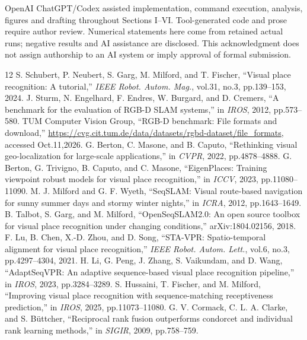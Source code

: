 \documentclass[conference,letterpaper]{IEEEtran}
\begin{document}
OpenAI ChatGPT/Codex assisted implementation, command execution, analysis, figures and drafting throughout Sections I--VI. Tool-generated code and prose require author review. Numerical statements here come from retained actual runs; negative results and AI assistance are disclosed. This acknowledgment does not assign authorship to an AI system or imply approval of formal submission.

\begin{thebibliography}{12}
 S. Schubert, P. Neubert, S. Garg, M. Milford, and T. Fischer, ``Visual place recognition: A tutorial,'' \emph{IEEE Robot. Autom. Mag.}, vol.31, no.3, pp.139--153, 2024.
 J. Sturm, N. Engelhard, F. Endres, W. Burgard, and D. Cremers, ``A benchmark for the evaluation of RGB-D SLAM systems,'' in \emph{IROS}, 2012, pp.573--580.
 TUM Computer Vision Group, ``RGB-D benchmark: File formats and download,'' \url{https://cvg.cit.tum.de/data/datasets/rgbd-dataset/file_formats}, accessed Oct.11,2026.
 G. Berton, C. Masone, and B. Caputo, ``Rethinking visual geo-localization for large-scale applications,'' in \emph{CVPR}, 2022, pp.4878--4888.
 G. Berton, G. Trivigno, B. Caputo, and C. Masone, ``EigenPlaces: Training viewpoint robust models for visual place recognition,'' in \emph{ICCV}, 2023, pp.11080--11090.
 M. J. Milford and G. F. Wyeth, ``SeqSLAM: Visual route-based navigation for sunny summer days and stormy winter nights,'' in \emph{ICRA}, 2012, pp.1643--1649.
 B. Talbot, S. Garg, and M. Milford, ``OpenSeqSLAM2.0: An open source toolbox for visual place recognition under changing conditions,'' arXiv:1804.02156, 2018.
 F. Lu, B. Chen, X.-D. Zhou, and D. Song, ``STA-VPR: Spatio-temporal alignment for visual place recognition,'' \emph{IEEE Robot. Autom. Lett.}, vol.6, no.3, pp.4297--4304, 2021.
 H. Li, G. Peng, J. Zhang, S. Vaikundam, and D. Wang, ``AdaptSeqVPR: An adaptive sequence-based visual place recognition pipeline,'' in \emph{IROS}, 2023, pp.3284--3289.
 S. Hussaini, T. Fischer, and M. Milford, ``Improving visual place recognition with sequence-matching receptiveness prediction,'' in \emph{IROS}, 2025, pp.11073--11080.
 G. V. Cormack, C. L. A. Clarke, and S. B\"uttcher, ``Reciprocal rank fusion outperforms condorcet and individual rank learning methods,'' in \emph{SIGIR}, 2009, pp.758--759.
\end{thebibliography}
\end{document}
